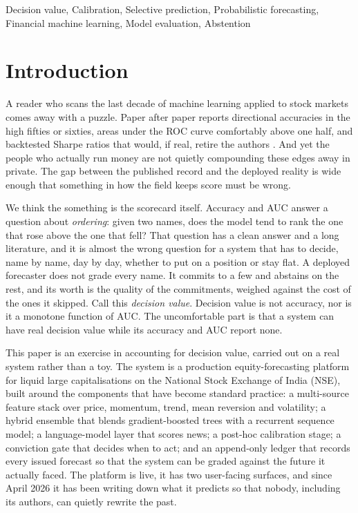 \documentclass{sbc2023}%
\theoremstyle{definition}
\theoremstyle{plain}
\begin{document}
\begin{frontmatter}
\begin{keywords}
Decision value, Calibration, Selective prediction, Probabilistic forecasting, Financial machine learning, Model evaluation, Abstention
\end{keywords}

\end{frontmatter}

\section{Introduction}
\label{sec:intro}
A reader who scans the last decade of machine learning applied to stock markets
comes away with a puzzle. Paper after paper reports directional accuracies in the
high fifties or sixties, areas under the ROC curve comfortably above one half, and
backtested Sharpe ratios that would, if real, retire the authors
\citep{sezer2020,jiang2021}. And yet the people who actually run money are not
quietly compounding these edges away in private. The gap between the published
record and the deployed reality is wide enough that something in how the field
keeps score must be wrong.

We think the something is the scorecard itself. Accuracy and AUC answer a question
about \emph{ordering}: given two names, does the model tend to rank the one that
rose above the one that fell? That question has a clean answer and a long
literature, and it is almost the wrong question for a system that has to decide,
name by name, day by day, whether to put on a position or stay flat. A deployed
forecaster does not grade every name. It commits to a few and abstains on the rest,
and its worth is the quality of the commitments, weighed against the cost of the
ones it skipped. Call this \emph{decision value}. Decision value is not accuracy,
nor is it a monotone function of AUC. The uncomfortable part is that a system can
have real decision value while its accuracy and AUC report none.

This paper is an exercise in accounting for decision value, carried out on a real
system rather than a toy. The system is a production equity-forecasting platform
for liquid large capitalisations on the National Stock Exchange of India (NSE),
built around the components that have become standard practice: a multi-source
feature stack over price, momentum, trend, mean reversion and volatility; a hybrid
ensemble that blends gradient-boosted trees with a recurrent sequence model; a
language-model layer that scores news; a post-hoc calibration stage; a conviction
gate that decides when to act; and an append-only ledger that records every issued
forecast so that the system can be graded against the future it actually faced.
The platform is live, it has two user-facing surfaces, and since April 2026 it has
been writing down what it predicts so that nobody, including its authors, can quietly
rewrite the past.
\end{document}
